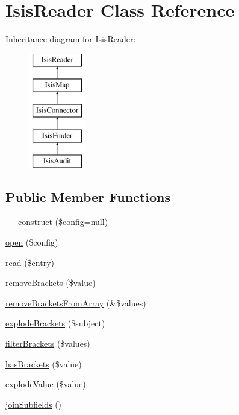 \hypertarget{classIsisReader}{
\section{IsisReader Class Reference}
\label{classIsisReader}
}
Inheritance diagram for IsisReader:\begin{figure}[H]
\begin{center}
\leavevmode
\includegraphics[height=5cm]{classIsisReader}
\end{center}
\end{figure}
\subsection*{Public Member Functions}
\begin{DoxyCompactItemize}
\item 
\hyperlink{classIsisReader_a70d1444cf56269795b4947dd82b2a4ac}{\_\-\_\-construct} (\$config=null)
\item 
\hyperlink{classIsisReader_afa6e3d3d94854913e5ed2604919d2316}{open} (\$config)
\item 
\hyperlink{classIsisReader_a630791a319bec2bc55d0102cbb7f93df}{read} (\$entry)
\item 
\hyperlink{classIsisReader_a99ce7b10b2997dad6a64558ac1f9f10e}{removeBrackets} (\$value)
\item 
\hyperlink{classIsisReader_a60ece3bbe11a2b4ac6afa6e65f282724}{removeBracketsFromArray} (\&\$values)
\item 
\hyperlink{classIsisReader_a4610ebcf69c197e2c596965e2dc0358e}{explodeBrackets} (\$subject)
\item 
\hyperlink{classIsisReader_aa6099ed6bd276b32bd7bba184f144529}{filterBrackets} (\$values)
\item 
\hyperlink{classIsisReader_a109a6ef49b2190bfbcee796dae954baf}{hasBrackets} (\$value)
\item 
\hyperlink{classIsisReader_a3cc08df25da082046d496db93778709b}{explodeValue} (\$value)
\item 
\hyperlink{classIsisReader_ae65e172e3b5c9ac3c8a5e1352ba80904}{joinSubfields} ()
\end{DoxyCompactItemize}


